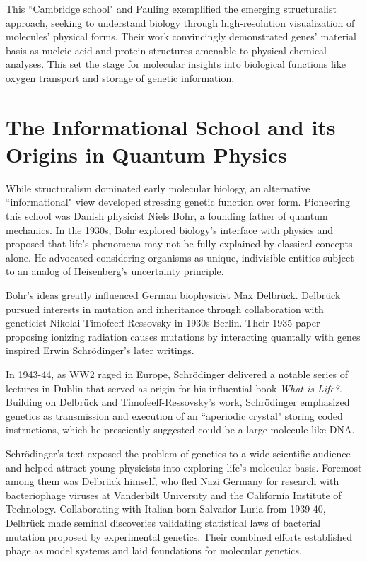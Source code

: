 This ``Cambridge school" and Pauling exemplified the emerging structuralist approach, seeking to understand biology through high-resolution visualization of molecules' physical forms. Their work convincingly demonstrated genes' material basis as nucleic acid and protein structures amenable to physical-chemical analyses. This set the stage for molecular insights into biological functions like oxygen transport and storage of genetic information.

\section{The Informational School and its Origins in Quantum Physics}

While structuralism dominated early molecular biology, an alternative ``informational" view developed stressing genetic function over form. Pioneering this school was Danish physicist Niels Bohr, a founding father of quantum mechanics. In the 1930s, Bohr explored biology's interface with physics and proposed that life's phenomena may not be fully explained by classical concepts alone. He advocated considering organisms as unique, indivisible entities subject to an analog of Heisenberg's uncertainty principle.

Bohr's ideas greatly influenced German biophysicist Max Delbrück. Delbrück pursued interests in mutation and inheritance through collaboration with geneticist Nikolai Timofeeff-Ressovsky in 1930s Berlin. Their 1935 paper proposing ionizing radiation causes mutations by interacting quantally with genes inspired Erwin Schrödinger's later writings.

In 1943-44, as WW2 raged in Europe, Schrödinger delivered a notable series of lectures in Dublin that served as origin for his influential book \emph{What is Life?}. Building on Delbrück and Timofeeff-Ressovsky's work, Schrödinger emphasized genetics as transmission and execution of an ``aperiodic crystal" storing coded instructions, which he presciently suggested could be a large molecule like DNA.

Schrödinger's text exposed the problem of genetics to a wide scientific audience and helped attract young physicists into exploring life's molecular basis. Foremost among them was Delbrück himself, who fled Nazi Germany for research with bacteriophage viruses at Vanderbilt University and the California Institute of Technology. Collaborating with Italian-born Salvador Luria from 1939-40, Delbrück made seminal discoveries validating statistical laws of bacterial mutation proposed by experimental genetics. Their combined efforts established phage as model systems and laid foundations for molecular genetics.

